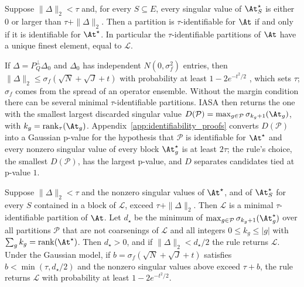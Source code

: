 \begin{theorem}
\label{thm:latent_recovery}
Suppose \(\|\Delta\|_2<\tau\) and, for every \(S\subseteq E\), every singular value of
\(\At^\star_S\) is either \(0\) or larger than \(\tau+\|\Delta\|_2\).  Then a partition is
\(\tau\)-identifiable for \(\At\) if and only if it is identifiable for \(\At^\star\).  In
particular the \(\tau\)-identifiable partitions of \(\At\) have a unique finest element,
equal to \(\mathcal L\).
\end{theorem}

If \(\Delta=P_Q^\perp\Delta_0\) and \(\Delta_0\) has independent \(N(0,\sigma_f^2)\)
entries, then \(\|\Delta\|_2\le\sigma_f(\sqrt N+\sqrt J+t)\) with probability at least
\(1-2e^{-t^2/2}\) \citep[Corollary~5.35]{vershynin2012introduction}, which sets
\(\tau\); \(\sigma_f\) comes from the spread of an operator ensemble.  Without the
margin condition there can be several minimal \(\tau\)-identifiable partitions.  IASA
then returns the one with the smallest largest discarded singular value
\(D(\mathcal P)=\max_{g\in\mathcal P}\sigma_{k_g+1}(\At_g)\), with
\(k_g=\operatorname{rank}_\tau(\At_g)\).  Appendix~\ref{app:identifiability_proofs}
converts \(D(\mathcal P)\) into a Gaussian p-value for the hypothesis that \(\mathcal P\)
is identifiable for \(\At^\star\) and every nonzero singular value of every block
\(\At^\star_g\) is at least \(2\tau\); the rule's choice, the smallest \(D(\mathcal P)\), has the largest p-value, and
\(D\) separates candidates tied at p-value \(1\).

\begin{proposition}
\label{prop:latent_tiebreak}
Suppose \(\|\Delta\|_2<\tau\) and the nonzero singular values of \(\At^\star\), and of
\(\At^\star_S\) for every \(S\) contained in a block of \(\mathcal L\), exceed
\(\tau+\|\Delta\|_2\).  Then \(\mathcal L\) is a minimal \(\tau\)-identifiable
partition of \(\At\).  Let \(d_\star\) be the minimum of
\(\max_{g\in\mathcal P}\sigma_{k_g+1}(\At^\star_g)\) over all partitions \(\mathcal P\)
that are not coarsenings of \(\mathcal L\) and all integers \(0\le k_g\le|g|\) with
\(\sum_gk_g=\operatorname{rank}(\At^\star)\).  Then \(d_\star>0\), and if
\(\|\Delta\|_2<d_\star/2\) the rule returns \(\mathcal L\).  Under the Gaussian model, if
\(b=\sigma_f(\sqrt N+\sqrt J+t)\) satisfies \(b<\min(\tau,d_\star/2)\) and the
nonzero singular values above exceed \(\tau+b\), the rule returns \(\mathcal L\) with
probability at least \(1-2e^{-t^2/2}\).
\end{proposition}

